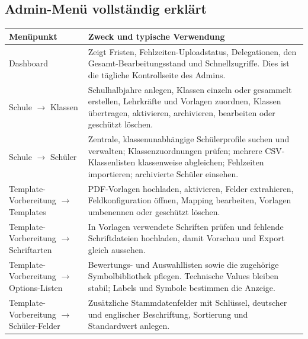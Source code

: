 \documentclass[12pt,a4paper]{article}
\begin{document}
\subsection{Admin-Menü vollständig erklärt}\label{sec:admin-menu}
\small
\begin{longtable}{|p{}|p{}|}
\hline
\textbf{Menüpunkt} & \textbf{Zweck und typische Verwendung}\\
\hline
Dashboard & Zeigt Fristen, Fehlzeiten-Uploadstatus, Delegationen, den Gesamt-Bearbeitungsstand und Schnellzugriffe. Dies ist die tägliche Kontrollseite des Admins.\\
\hline
Schule \(\rightarrow\) Klassen & Schulhalbjahre anlegen, Klassen einzeln oder gesammelt erstellen, Lehrkräfte und Vorlagen zuordnen, Klassen übertragen, aktivieren, archivieren, bearbeiten oder geschützt löschen.\\
\hline
Schule \(\rightarrow\) Schüler & Zentrale, klassenunabhängige Schülerprofile suchen und verwalten; Klassenzuordnungen prüfen; mehrere CSV-Klassenlisten klassenweise abgleichen; Fehlzeiten importieren; archivierte Schüler einsehen.\\
\hline
Template-Vorbereitung \(\rightarrow\) Templates & PDF-Vorlagen hochladen, aktivieren, Felder extrahieren, Feldkonfiguration öffnen, Mapping bearbeiten, Vorlagen umbenennen oder geschützt löschen.\\
\hline
Template-Vorbereitung \(\rightarrow\) Schriftarten & In Vorlagen verwendete Schriften prüfen und fehlende Schriftdateien hochladen, damit Vorschau und Export gleich aussehen.\\
\hline
Template-Vorbereitung \(\rightarrow\) Options-Listen & Bewertungs- und Auswahllisten sowie die zugehörige Symbolbibliothek pflegen. Technische Values bleiben stabil; Labels und Symbole bestimmen die Anzeige.\\
\hline
Template-Vorbereitung \(\rightarrow\) Schüler-Felder & Zusätzliche Stammdatenfelder mit Schlüssel, deutscher und englischer Beschriftung, Sortierung und Standardwert anlegen.\\

\end{longtable}
\end{document}
